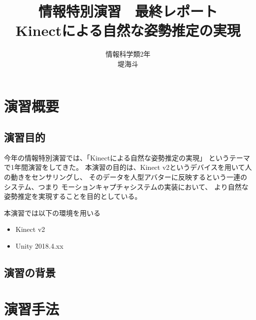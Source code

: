 \documentclass[a4j]{jsarticle}
\begin{document}
\begin{titlepage}
  \title{情報特別演習　最終レポート\\ Kinectによる自然な姿勢推定の実現}
  \author{情報科学類2年\\堤海斗}
  \maketitle
  \thispagestyle{empty}
  
\end{titlepage}

\begin{comment}
  ・演習概要
    ・演習テーマと背景
    ・演習目的
  ・演習手法
    ・FKによる姿勢推定
    ・自然な姿勢推定
      ・IKの導入
      ・キャリブレーションの導入
      ・フィルターの導入
  ・演習結果とまとめ
    ・実装結果
    ・現在取り組んでいる項目
    ・今後の展望
    ・演習で得られたこと
\end{comment}

\section{演習概要}

\subsection{演習目的}

今年の情報特別演習では、「Kinectによる自然な姿勢推定の実現」
というテーマで1年間演習をしてきた。
本演習の目的は、Kinect v2というデバイスを用いて人の動きをセンサリングし、
そのデータを人型アバターに反映するという一連のシステム、つまり
モーションキャプチャシステムの実装において、
より自然な姿勢推定を実現することを目的としている。

本演習では以下の環境を用いる

\begin{itemize}
  \item Kinect v2
  \item Unity 2018.4.xx 
\end{itemize}

\subsection{演習の背景}


\section{演習手法}
\end{document}
